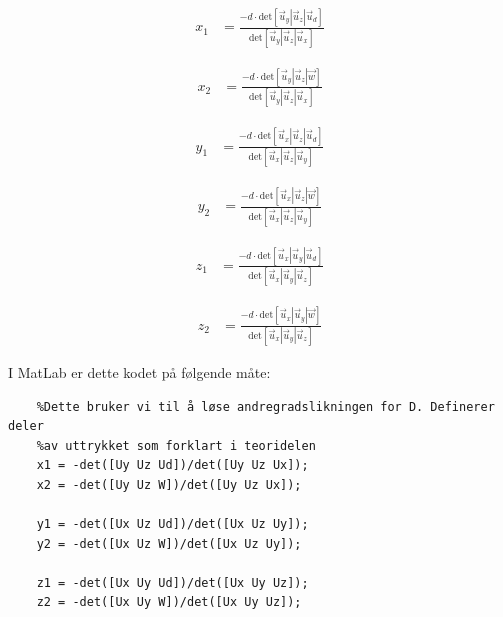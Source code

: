 \begin{align}
	x_1&=\frac{-d\cdot\text{det}[\vec{u}_y|\vec{u}_z | \vec{u}_d]}{\text{det}[\vec{u}_y|\vec{u}_z | \vec{u}_x]}\nonumber 
\end{align}

\begin{align}
	x_2&=\frac{-d\cdot\text{det}[\vec{u}_y|\vec{u}_z | \vec{w}]}{\text{det}[\vec{u}_y|\vec{u}_z | \vec{u}_x]}\nonumber 
\end{align}

\begin{align}
	y_1&=\frac{-d\cdot\text{det}[\vec{u}_x|\vec{u}_z | \vec{u}_d]}{\text{det}[\vec{u}_x|\vec{u}_z | \vec{u}_y]}\nonumber 
\end{align}

\begin{align}
    y_2&=\frac{-d\cdot\text{det}[\vec{u}_x|\vec{u}_z | \vec{w}]}{\text{det}[\vec{u}_x|\vec{u}_z | \vec{u}_y]}\nonumber 
\end{align}

\begin{align}
    z_1&=\frac{-d\cdot\text{det}[\vec{u}_x|\vec{u}_y | \vec{u}_d]}{\text{det}[\vec{u}_x|\vec{u}_y | \vec{u}_z]}\nonumber
\end{align}

\begin{align}
    z_2&=\frac{-d\cdot\text{det}[\vec{u}_x|\vec{u}_y | \vec{w}]}{\text{det}[\vec{u}_x|\vec{u}_y | \vec{u}_z]}\nonumber 
\end{align}

I MatLab er dette kodet på følgende måte: 
\begin{lstlisting}
	%Dette bruker vi til å løse andregradslikningen for D. Definerer deler 
	%av uttrykket som forklart i teoridelen 
	x1 = -det([Uy Uz Ud])/det([Uy Uz Ux]);
	x2 = -det([Uy Uz W])/det([Uy Uz Ux]);

	y1 = -det([Ux Uz Ud])/det([Ux Uz Uy]);
	y2 = -det([Ux Uz W])/det([Ux Uz Uy]);

	z1 = -det([Ux Uy Ud])/det([Ux Uy Uz]);
	z2 = -det([Ux Uy W])/det([Ux Uy Uz]);
\end{lstlisting} 

